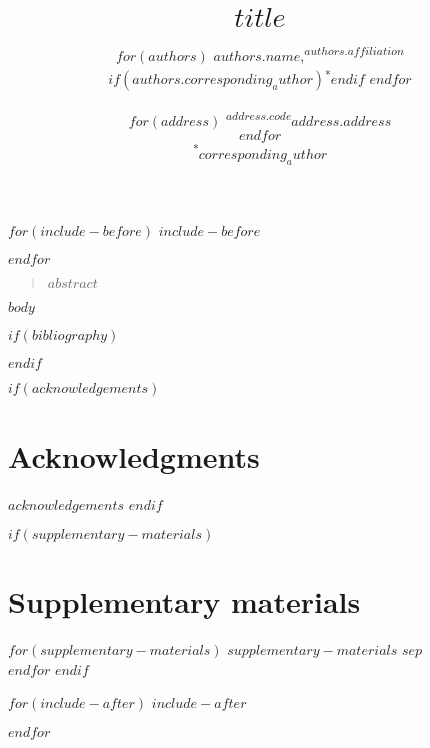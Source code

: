 \documentclass[$if(fontsize)$$fontsize$,$endif$]{article}
\title{$title$}
\author{
$for(authors)$
$authors.name$,\textsuperscript{$authors.affiliation$}$if(authors.corresponding_author)$\textsuperscript{*}$endif$
$endfor$\\
\\
$for(address)$
\normalsize{\textsuperscript{$address.code$}$address.address$}\\
$endfor$
\\
\textsuperscript{*}$corresponding_author$
}
\date{}
\newenvironment{sciabstract}{%
\begin{quote} \singlespacing}
{\end{quote}}
\begin{document}
$for(include-before)$
$include-before$

$endfor$

\baselineskip24pt


\maketitle


\begin{sciabstract}
$abstract$
\end{sciabstract}

$body$

$if(bibliography)$


$endif$

$if(acknowledgements)$
\section*{Acknowledgments}
$acknowledgements$
$endif$


$if(supplementary-materials)$
\hypertarget{supplementary-materials}{%
\section{Supplementary materials}\label{supplementary-materials}}

$for(supplementary-materials)$
$supplementary-materials$ $sep$\\
$endfor$
$endif$

$for(include-after)$
$include-after$

$endfor$

\renewcommand{\thetable}{\arabic{table}}
\renewcommand{\thefigure}{\arabic{figure}}
\setcounter{table}{0}
\setcounter{figure}{0}









\end{document}
